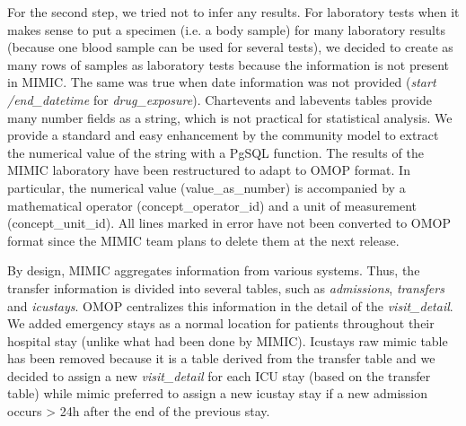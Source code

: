 For the second step, we tried not to infer any results. For laboratory tests when 
it makes sense to put a specimen (i.e. a body sample) for many laboratory results 
(because one blood sample can be used for several tests), we decided to create as 
many rows of samples as laboratory tests because the information is not present 
in MIMIC. The same was true when date information was not provided (\textit{start
/end\_datetime} for \textit{drug\_exposure}).
Chartevents and labevents tables provide many number fields as a string, which is 
not practical for statistical analysis. We provide a standard and easy enhancement 
by the community model to extract the numerical value of the string with a PgSQL 
function. The results of the MIMIC laboratory have been restructured to adapt to 
OMOP format. In particular, the numerical value (value\_as\_number) is accompanied 
by a mathematical operator (concept\_operator\_id) and a unit of measurement 
(concept\_unit\_id). All lines marked in error have not been converted to OMOP 
format since the MIMIC team plans to delete them at the next release.

By design, MIMIC aggregates information from various systems\cite{mimic-omop}.
Thus, the transfer information is divided into several tables, such as
\textit{admissions}, \textit{transfers} and \textit{icustays}. OMOP centralizes
this information in the detail of the \textit{visit\_detail}. 
We added emergency stays as a normal location for patients throughout their 
hospital stay (unlike what had been done by MIMIC). Icustays raw mimic table has 
been removed because it is a table derived from the transfer table \cite{icustays-doc} 
and we decided to assign a new \textit{visit\_detail} for each ICU stay (based on 
the transfer table) while mimic preferred to assign a new icustay stay if a new 
admission occurs > 24h after the end of the previous stay.

